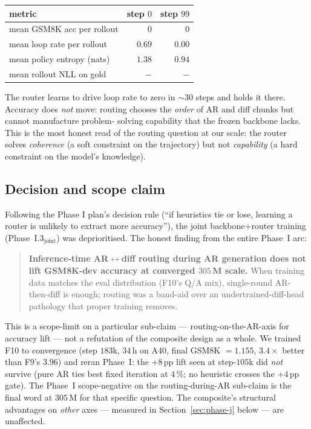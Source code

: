 \begin{center}
\begin{tabular}{lrr}
\toprule
metric & step $0$ & step $99$ \\
\midrule
mean GSM8K acc per rollout & $0$ & $0$ \\
mean loop rate per rollout & $\mathbf{0.69}$ & $\mathbf{0.00}$ \\
mean policy entropy (nats) & $1.38$ & $0.94$ \\
mean rollout NLL on gold & $-$ & $-$ \\
\bottomrule
\end{tabular}
\end{center}

The router learns to drive loop rate to zero in $\sim 30$ steps and
holds it there. Accuracy does \emph{not} move: routing chooses the
\emph{order} of AR and diff chunks but cannot manufacture problem-
solving capability that the frozen backbone lacks. This is the most
honest read of the routing question at our scale: the router
solves \emph{coherence} (a soft constraint on the trajectory) but
not \emph{capability} (a hard constraint on the model's knowledge).

\subsection{Decision and scope claim}

Following the Phase I plan's decision rule (``if heuristics tie or
lose, learning a router is unlikely to extract more accuracy''), the
joint backbone+router training (Phase~I.3$_\text{joint}$) was
deprioritised. The honest finding from the entire Phase~I arc:

\begin{quote}
\textbf{Inference-time AR$\leftrightarrow$diff routing during AR
generation does not lift GSM8K-dev accuracy at converged $305$\,M
scale.} When training data matches the eval distribution (F10's
Q/A mix), single-round AR-then-diff is enough; routing was a
band-aid over an undertrained-diff-head pathology that proper training
removes.
\end{quote}

This is a scope-limit on a particular sub-claim — routing-on-the-AR-axis
for accuracy lift — not a refutation of the composite design as a
whole. We trained F10 to convergence (step $183$k, $34$\,h on A40,
final GSM8K \arNLL{} $=1.155$, $3.4\times$ better than F9's $3.96$)
and reran Phase~I: the $+8$\,pp lift seen at step-$105$k did \emph{not}
survive (pure AR ties best fixed iteration at $4\,\%$; no heuristic
crosses the $+4$\,pp gate). The Phase~I scope-negative on the
routing-during-AR sub-claim is the final word at $305$\,M for that
specific question. The composite's structural advantages on
\emph{other} axes — measured in Section~\ref{sec:phase-j} below —
are unaffected.

